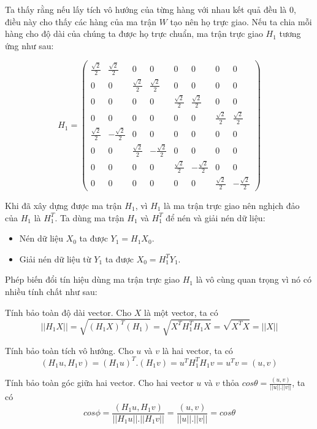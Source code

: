 \noindent Ta thấy rằng nếu lấy tích vô hướng của từng hàng với nhau kết quả đều là 0, điều này cho thấy các hàng của ma trận $W$ tạo nên họ trực giao.
Nếu ta chia mỗi hàng cho độ dài của chúng ta được họ trực chuẩn, ma trận trực giao $H_1$ tương ứng như sau:
\begin{center}
    $$H_1 = \begin{pmatrix}
        \frac{\sqrt{2}}{2} &  \frac{\sqrt{2}}{2} &  0 &  0 &  0 &  0 &  0 &  0 \\
        0 &  0 &  \frac{\sqrt{2}}{2} &  \frac{\sqrt{2}}{2} &  0 &  0 &  0 &  0 \\
        0 &  0 &  0 &  0 &  \frac{\sqrt{2}}{2} &  \frac{\sqrt{2}}{2} &  0 &  0 \\
        0 &  0 &  0 &  0 &  0 &  0 &  \frac{\sqrt{2}}{2} &  \frac{\sqrt{2}}{2} \\
        \frac{\sqrt{2}}{2} & -\frac{\sqrt{2}}{2} &  0 &  0 &  0 &  0 &  0 &  0 \\
        0 &  0 &  \frac{\sqrt{2}}{2} & -\frac{\sqrt{2}}{2} &  0 &  0 &  0 &  0 \\
        0 &  0 &  0 &  0 &  \frac{\sqrt{2}}{2} & -\frac{\sqrt{2}}{2} &  0 &  0 \\
        0 &  0 &  0 &  0 &  0 &  0 &  \frac{\sqrt{2}}{2} & -\frac{\sqrt{2}}{2}
    \end{pmatrix}$$
\end{center}

\noindent Khi đã xây dựng được ma trận $H_1$, vì $H_1$ là ma trận trực giao nên nghịch đảo của $H_1$ là $H_1^T$. 
Ta dùng ma trận $H_1$ và $H_1^T$ để nén và giải nén dữ liệu:
\begin{itemize}
    \item Nén dữ liệu $X_{0}$ ta được $Y_{1}=H_1X_{0}$.
    \item Giải nén dữ liệu từ $Y_{1}$ ta được $X_{0}=H_1^TY_{1}$.
\end{itemize} 

Phép biến đổi tín hiệu dùng ma trận trực giao $H_1$ là vô cùng quan trọng vì nó có nhiều tính chất như sau:

\noindent Tính bảo toàn độ dài vector. Cho $X$ là một vector, ta có
$$||H_1X||=\sqrt{(H_1X)^T(H_1)}=\sqrt{X^TH_1^TH_1X}=\sqrt{X^TX}=||X||$$

\noindent Tính bảo toàn tích vô hướng. Cho $u$ và $v$ là hai vector, ta có
$$(H_1u,H_1v)=(H_1u)^T.(H_1v)=u^TH_1^TH_1v=u^Tv=(u,v)$$

\noindent Tính bảo toàn góc giữa hai vector. Cho hai vector $u$ và $v$ thỏa $cos\theta=\frac{(u,v)}{||u||.||v||}$, ta có
$$cos\phi=\frac{(H_1u,H_1v)}{||H_1u||.||H_1v||}=\frac{(u,v)}{||u||.||v||}=cos\theta$$


